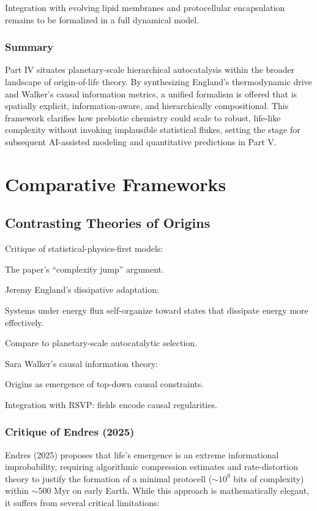 \documentclass{book}
\begin{document}
Integration with evolving lipid membranes and protocellular encapsulation remains to be formalized in a full dynamical model.

\section{Summary}
Part IV situates planetary-scale hierarchical autocatalysis within the broader landscape of origin-of-life theory. By synthesizing England’s thermodynamic drive and Walker’s causal information metrics, a unified formalism is offered that is spatially explicit, information-aware, and hierarchically compositional. This framework clarifies how prebiotic chemistry could scale to robust, life-like complexity without invoking implausible statistical flukes, setting the stage for subsequent AI-assisted modeling and quantitative predictions in Part V.

\part{Comparative Frameworks}

\chapter{Contrasting Theories of Origins}
Critique of statistical-physics-first models:

The paper’s “complexity jump” argument.

Jeremy England’s dissipative adaptation:

Systems under energy flux self-organize toward states that dissipate energy more effectively.

Compare to planetary-scale autocatalytic selection.

Sara Walker’s causal information theory:

Origins as emergence of top-down causal constraints.

Integration with RSVP: fields encode causal regularities.

\section{Critique of Endres (2025)}
Endres (2025) proposes that life’s emergence is an extreme informational improbability, requiring algorithmic compression estimates and rate-distortion theory to justify the formation of a minimal protocell ($\sim10^9$ bits of complexity) within $\sim$500 Myr on early Earth. While this approach is mathematically elegant, it suffers from several critical limitations:
\end{document}
